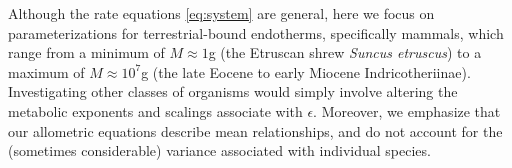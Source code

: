 \documentclass{pnastwo}
\begin{document}
\begin{article}

Although the rate equations \eqref{eq:system} are general, here we focus on
parameterizations for terrestrial-bound endotherms, specifically mammals,
which range from a minimum of $M\approx1$g (the Etruscan shrew
\emph{Suncus etruscus}) to a maximum of $M\approx10^7$g (the late Eocene
to early Miocene Indricotheriinae).  Investigating other classes of organisms
would simply involve altering the metabolic exponents and scalings associate
with $\epsilon$. Moreover, we emphasize that our allometric equations
describe mean relationships, and do not account for the (sometimes
considerable) variance associated with individual species.
\\


\end{article}
\end{document}
